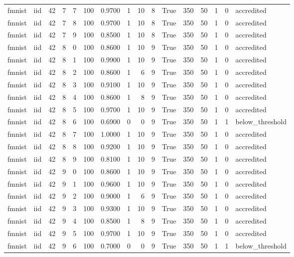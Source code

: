\begin{tabular}{llrrrrrrrrrrrrrl}
fmnist & iid & 42 & 7 & 7 & 100 & 0.9700 & 1 & 10 & 8 & True & 350 & 50 & 1 & 0 & accredited \\
fmnist & iid & 42 & 7 & 8 & 100 & 0.9700 & 1 & 10 & 8 & True & 350 & 50 & 1 & 0 & accredited \\
fmnist & iid & 42 & 7 & 9 & 100 & 0.8500 & 1 & 10 & 8 & True & 350 & 50 & 1 & 0 & accredited \\
fmnist & iid & 42 & 8 & 0 & 100 & 0.8600 & 1 & 10 & 9 & True & 350 & 50 & 1 & 0 & accredited \\
fmnist & iid & 42 & 8 & 1 & 100 & 0.9900 & 1 & 10 & 9 & True & 350 & 50 & 1 & 0 & accredited \\
fmnist & iid & 42 & 8 & 2 & 100 & 0.8600 & 1 & 6 & 9 & True & 350 & 50 & 1 & 0 & accredited \\
fmnist & iid & 42 & 8 & 3 & 100 & 0.9100 & 1 & 10 & 9 & True & 350 & 50 & 1 & 0 & accredited \\
fmnist & iid & 42 & 8 & 4 & 100 & 0.8600 & 1 & 8 & 9 & True & 350 & 50 & 1 & 0 & accredited \\
fmnist & iid & 42 & 8 & 5 & 100 & 0.9700 & 1 & 10 & 9 & True & 350 & 50 & 1 & 0 & accredited \\
fmnist & iid & 42 & 8 & 6 & 100 & 0.6900 & 0 & 0 & 9 & True & 350 & 50 & 1 & 1 & below\_threshold \\
fmnist & iid & 42 & 8 & 7 & 100 & 1.0000 & 1 & 10 & 9 & True & 350 & 50 & 1 & 0 & accredited \\
fmnist & iid & 42 & 8 & 8 & 100 & 0.9200 & 1 & 10 & 9 & True & 350 & 50 & 1 & 0 & accredited \\
fmnist & iid & 42 & 8 & 9 & 100 & 0.8100 & 1 & 10 & 9 & True & 350 & 50 & 1 & 0 & accredited \\
fmnist & iid & 42 & 9 & 0 & 100 & 0.8600 & 1 & 10 & 9 & True & 350 & 50 & 1 & 0 & accredited \\
fmnist & iid & 42 & 9 & 1 & 100 & 0.9600 & 1 & 10 & 9 & True & 350 & 50 & 1 & 0 & accredited \\
fmnist & iid & 42 & 9 & 2 & 100 & 0.9000 & 1 & 6 & 9 & True & 350 & 50 & 1 & 0 & accredited \\
fmnist & iid & 42 & 9 & 3 & 100 & 0.9300 & 1 & 10 & 9 & True & 350 & 50 & 1 & 0 & accredited \\
fmnist & iid & 42 & 9 & 4 & 100 & 0.8500 & 1 & 8 & 9 & True & 350 & 50 & 1 & 0 & accredited \\
fmnist & iid & 42 & 9 & 5 & 100 & 0.9700 & 1 & 10 & 9 & True & 350 & 50 & 1 & 0 & accredited \\
fmnist & iid & 42 & 9 & 6 & 100 & 0.7000 & 0 & 0 & 9 & True & 350 & 50 & 1 & 1 & below\_threshold \\

\end{tabular}
